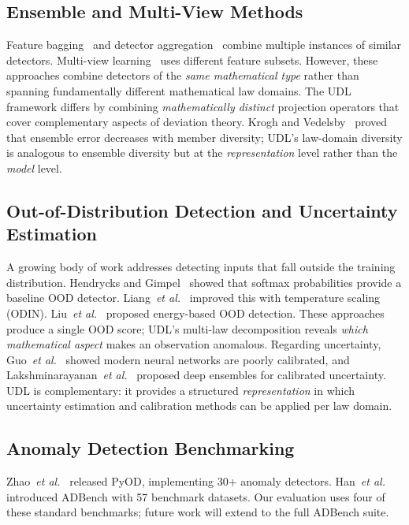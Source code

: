 \documentclass[journal]{IEEEtran}
\newcommand{\etal}{\textit{et al.}}
\begin{document}
\subsection{Ensemble and Multi-View Methods}

Feature bagging~\cite{lazarevic2005feature} and detector aggregation~\cite{aggarwal2015theoretical} combine multiple instances of similar detectors. Multi-view learning~\cite{zhao2015multi} uses different feature subsets. However, these approaches combine detectors of the \textit{same mathematical type} rather than spanning fundamentally different mathematical law domains. The UDL framework differs by combining \textit{mathematically distinct} projection operators that cover complementary aspects of deviation theory. Krogh and Vedelsby~\cite{krogh1995neural} proved that ensemble error decreases with member diversity; UDL's law-domain diversity is analogous to ensemble diversity but at the \textit{representation} level rather than the \textit{model} level.

\subsection{Out-of-Distribution Detection and Uncertainty Estimation}

A growing body of work addresses detecting inputs that fall outside the training distribution. Hendrycks and Gimpel~\cite{hendrycks2017baseline} showed that softmax probabilities provide a baseline OOD detector. Liang~\etal~\cite{liang2018odin} improved this with temperature scaling (ODIN). Liu~\etal~\cite{liu2020energy} proposed energy-based OOD detection. These approaches produce a single OOD score; UDL's multi-law decomposition reveals \textit{which mathematical aspect} makes an observation anomalous. Regarding uncertainty, Guo~\etal~\cite{guo2017calibration} showed modern neural networks are poorly calibrated, and Lakshminarayanan~\etal~\cite{lakshminarayanan2017ensembles} proposed deep ensembles for calibrated uncertainty. UDL is complementary: it provides a structured \textit{representation} in which uncertainty estimation and calibration methods can be applied per law domain.

\subsection{Anomaly Detection Benchmarking}

Zhao~\etal~\cite{zhao2019pyod} released PyOD, implementing 30+ anomaly detectors. Han~\etal~\cite{han2022adbench} introduced ADBench with 57 benchmark datasets. Our evaluation uses four of these standard benchmarks; future work will extend to the full ADBench suite.
\end{document}

